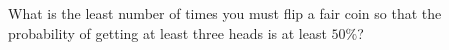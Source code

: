 What is the least number of times you must flip a fair coin so that the probability of getting at least three heads is at least $50\%$?
